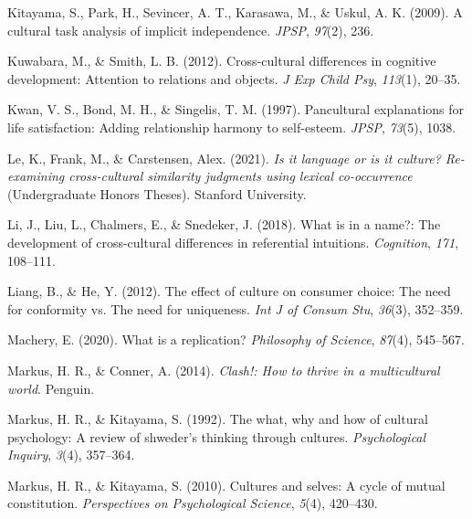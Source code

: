 \documentclass[
  man,floatsintext]{apa6}
\newlength{\cslhangindent}
\newlength{\cslentryspacingunit} %
\newenvironment{CSLReferences}[2] %
 {%
  \setlength{\parindent}{0pt}
  \ifodd #1
  \let\oldpar\par
  \def\par{\hangindent=\cslhangindent\oldpar}
  \fi
  \setlength{\parskip}{#2\cslentryspacingunit}
 }%
 {}
\begin{document}
\begin{CSLReferences}{1}{0}
\leavevmode{}%
Kitayama, S., Park, H., Sevincer, A. T., Karasawa, M., \& Uskul, A. K. (2009). A cultural task analysis of implicit independence. \emph{JPSP}, \emph{97}(2), 236.

\leavevmode{}%
Kuwabara, M., \& Smith, L. B. (2012). Cross-cultural differences in cognitive development: Attention to relations and objects. \emph{J Exp Child Psy}, \emph{113}(1), 20--35.

\leavevmode{}%
Kwan, V. S., Bond, M. H., \& Singelis, T. M. (1997). Pancultural explanations for life satisfaction: Adding relationship harmony to self-esteem. \emph{JPSP}, \emph{73}(5), 1038.

\leavevmode{}%
Le, K., Frank, M., \& Carstensen, Alex. (2021). \emph{Is it language or is it culture? Re-examining cross-cultural similarity judgments using lexical co-occurrence} (Undergraduate Honors Theses). Stanford University.

\leavevmode{}%
Li, J., Liu, L., Chalmers, E., \& Snedeker, J. (2018). What is in a name?: The development of cross-cultural differences in referential intuitions. \emph{Cognition}, \emph{171}, 108--111.

\leavevmode{}%
Liang, B., \& He, Y. (2012). The effect of culture on consumer choice: The need for conformity vs. The need for uniqueness. \emph{Int J of Consum Stu}, \emph{36}(3), 352--359.

\leavevmode{}%
Machery, E. (2020). What is a replication? \emph{Philosophy of Science}, \emph{87}(4), 545--567.

\leavevmode{}%
Markus, H. R., \& Conner, A. (2014). \emph{Clash!: How to thrive in a multicultural world}. Penguin.

\leavevmode{}%
Markus, H. R., \& Kitayama, S. (1992). The what, why and how of cultural psychology: A review of shweder's thinking through cultures. \emph{Psychological Inquiry}, \emph{3}(4), 357--364.

\leavevmode{}%
Markus, H. R., \& Kitayama, S. (2010). Cultures and selves: A cycle of mutual constitution. \emph{Perspectives on Psychological Science}, \emph{5}(4), 420--430.


\end{CSLReferences}
\end{document}
